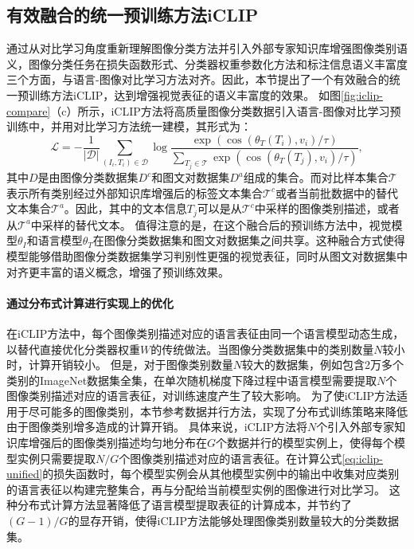 \subsection{有效融合的统一预训练方法iCLIP}
\label{sec:iclip-unify}
通过从对比学习角度重新理解图像分类方法并引入外部专家知识库增强图像类别语义，图像分类任务在损失函数形式、分类器权重参数化方法和标注信息语义丰富度三个方面，与语言-图像对比学习方法对齐。因此，本节提出了一个有效融合的统一预训练方法iCLIP，达到增强视觉表征的语义丰富度的效果。
如图\ref{fig:iclip-compare}（c）所示，iCLIP方法将高质量图像分类数据引入语言-图像对比学习预训练中，并用对比学习方法统一建模，其形式为：
\begin{equation}
   \mathcal{L}=-\frac{1}{|\mathcal{D}|} \sum_{\left(I_{i}, T_{i}\right) \in \mathcal{D}} \log \frac{\exp \left(\cos \left(\theta_{T}\left(T_{i}\right), v_{i}\right) / \tau\right)}{\sum_{T_{j} \in \mathcal{T}} \exp \left(\cos \left(\theta_{T}\left(T_{j}\right), v_{i}\right) / \tau\right)},
   \label{eq:iclip-unified}
\end{equation}
其中$D$是由图像分类数据集$D^{c}$和图文对数据集$D^{a}$组成的集合。而对比样本集合$\mathcal{T}$表示所有类别经过外部知识库增强后的标签文本集合$\mathcal{T}^{c}$或者当前批数据中的替代文本集合$\mathcal{T}^{a}$。因此，其中的文本信息$T_{j}$可以是从$\mathcal{T}^{c}$中采样的图像类别描述，或者从$\mathcal{T}^{a}$中采样的替代文本。
值得注意的是，在这个融合后的预训练方法中，视觉模型$\theta_{I}$和语言模型$\theta_{T}$在图像分类数据集和图文对数据集之间共享。这种融合方式使得模型能够借助图像分类数据集学习判别性更强的视觉表征，同时从图文对数据集中对齐更丰富的语义概念，增强了预训练效果。

\paragraph{通过分布式计算进行实现上的优化} 在iCLIP方法中，每个图像类别描述对应的语言表征由同一个语言模型动态生成，以替代直接优化分类器权重$W$的传统做法。当图像分类数据集中的类别数量$N$较小时，计算开销较小。
但是，对于图像类别数量$N$较大的数据集，例如包含2万多个类别的ImageNet数据集全集，在单次随机梯度下降过程中语言模型需要提取$N$个图像类别描述对应的语言表征，对训练速度产生了较大影响。
为了使iCLIP方法适用于尽可能多的图像类别，本节参考数据并行方法，实现了分布式训练策略\cite{chen2020simple}来降低由于图像类别增多造成的计算开销。
具体来说，iCLIP方法将$N$个引入外部专家知识库增强后的图像类别描述均匀地分布在$G$个数据并行的模型实例上，使得每个模型实例只需要提取$N/G$个图像类别描述对应的语言表征。在计算公式\eqref{eq:iclip-unified}的损失函数时，每个模型实例会从其他模型实例中的输出中收集对应类别的语言表征以构建完整集合，再与分配给当前模型实例的图像进行对比学习。
这种分布式计算方法显著降低了语言模型提取表征的计算成本，并节约了$(G-1)/G$的显存开销，使得iCLIP方法能够处理图像类别数量较大的分类数据集。

